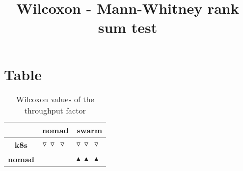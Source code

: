 \documentclass{article}
\title{Wilcoxon - Mann-Whitney rank sum test}
\author{}
\begin{document}
\maketitle
\section{Table}
\begin{table}[!htp]
  \caption{Wilcoxon values of the throughput factor}
  \label{table:throughput}
  \centering
  \begin{scriptsize}
  \begin{tabular}{c|cc}
      & \textbf{nomad} & \textbf{swarm} \\\hline
      \textbf{k8s} & $\triangledown\ \triangledown\ \triangledown\  $ & $ \triangledown\ \triangledown\ \triangledown\ $ \\
      \textbf{nomad} & $ $ & $ \blacktriangle\ \blacktriangle\ \blacktriangle\ $ \\
  \end{tabular}
  \end{scriptsize}
\end{table}
\end{document}
